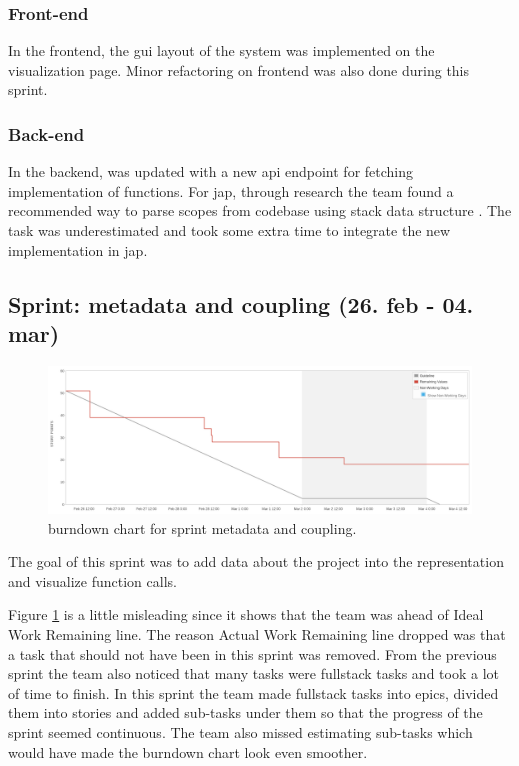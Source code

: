 \subsubsection{Front-end}
In the \gls{frontend}, the \gls{gui} layout of the system was implemented on the visualization page. Minor refactoring on \gls{frontend} was also done during this \gls{sprint}.

\subsubsection{Back-end}
In the \gls{backend}, was updated with a new \gls{api} endpoint for fetching implementation of functions. For \gls{jap}, through research the team found a recommended way to parse scopes from codebase using stack data structure \cite{parr2013definitive}. The task was underestimated and took some extra time to integrate the new implementation in \gls{jap}.

\subsection{Sprint: metadata and coupling (26. feb - 04. mar)}
\begin{figure}[H] 
    \includegraphics[width=\textwidth]{inc/images/sprints/sprintMetaData260219-040319.png}
    \caption{\Gls{burndown} chart for \gls{sprint} metadata and coupling.}
    \label{fig:sprintMetaDataAndCoupling}
\end{figure}
The goal of this \gls{sprint} was to add data about the project into the representation and visualize function calls.

Figure \ref{fig:sprintMetaDataAndCoupling} is a little misleading since it shows that the team was ahead of Ideal Work Remaining line. The reason Actual Work Remaining line dropped was that a task that should not have been in this \gls{sprint} was removed. From the previous \gls{sprint} the team also noticed that many tasks were \gls{fullstack} tasks and took a lot of time to finish. In this \gls{sprint} the team made \gls{fullstack} tasks into \glspl{epic}, divided them into stories and added sub-tasks under them so that the progress of the \gls{sprint} seemed continuous. The team also missed estimating sub-tasks which would have made the \gls{burndown} chart look even smoother. 

